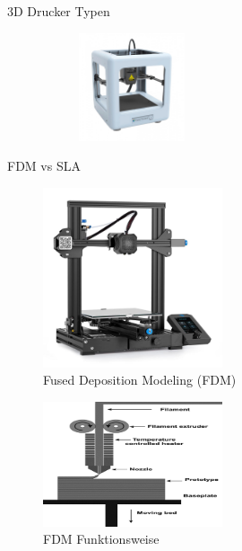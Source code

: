 \begin{frame}{3D Drucker Typen}
\begin{figure}[b]
\begin{minipage}[m]{0.49\textwidth}
         \begin{figure}
            \centering
            \includegraphics[height=90pt]{img_niklas/3d_printer2.jpg}
            \label{fig:my_label}
        \end{figure}
        \end{minipage}
    \end{figure}
    
\end{frame}

\begin{frame}{FDM vs SLA}
    \begin{minipage}[b]{.45\textwidth}
    \begin{figure}
        \centering
    \includegraphics[width=150pt]{img_niklas/3d_printer.jpg}        
    \caption*{Fused Deposition Modeling (FDM)}
    \end{figure}
    \end{minipage}
    \begin{minipage}[b]{.45\textwidth}
    \begin{figure}[]
        \centering
        \includegraphics[width=150pt]{img_niklas/Schematic-of-an-FDM-3D-printer-Reproduced-with-permission-from-12.png}
        \caption*{FDM Funktionsweise}
        \label{fig:my_label}
    \end{figure}
    \end{minipage}
\end{frame}

